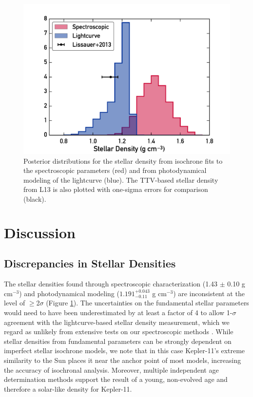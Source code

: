 \documentclass[twocolumn]{aastex61}
\newcommand{\gcm}{g cm$^{-3}$}
\begin{document}
\begin{figure}
\centering
\includegraphics[width=\columnwidth]{density}
\caption{Posterior distributions for the stellar density from isochrone fits to the spectroscopic parameters (red) and from photodynamical modeling of the lightcurve (blue). The TTV-based stellar density from L13 is also plotted with one-sigma errors for comparison (black).}
\label{fig:densities}
\end{figure}


\section{Discussion}
\label{s:discussion}
\subsection{Discrepancies in Stellar Densities}

The stellar densities found through spectroscopic characterization (1.43 $\pm$ 0.10 \gcm) and photodynamical modeling ($1.191^{+0.043}_{-0.11} $ \gcm) are inconsistent at the level of $\geq$2$\sigma$ (Figure \ref{fig:densities}). The uncertainties on the fundamental stellar parameters would need to have been underestimated by at least a factor of 4 to allow 1-$\sigma$ agreement with the lightcurve-based stellar density measurement, which we regard as unlikely from extensive tests on our spectroscopic methods \citep{Bedell2014,Ramirez2014}. While stellar densities from fundamental parameters can be strongly dependent on imperfect stellar isochrone models, we note that in this case Kepler-11's extreme similarity to the Sun places it near the anchor point of most models, increasing the accuracy of isochronal analysis. Moreover, multiple independent age determination methods support the result of a young, non-evolved age and therefore a solar-like density for Kepler-11.
\end{document}
